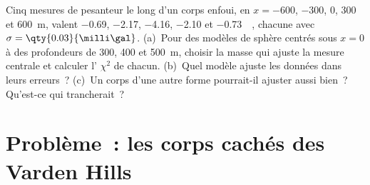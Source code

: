 \begin{exercise}[$\star\star\star$]\label{exo:b3:field-lab-methods-3:12}
Cinq mesures de pesanteur le long d'un corps enfoui, en $x = -600$, $-300$, $0$,
$300$ et \qty{600}{m}, valent \num{-0.69}, \num{-2.17}, \num{-4.16},
\num{-2.10} et \qty{-0.73}{\milli\gal}, chacune avec $\sigma =
\qty{0.03}{\milli\gal}$. (a)~Pour des modèles de sphère centrés sous $x = 0$ à des
profondeurs de \num{300}, \num{400} et \qty{500}{m}, choisir la masse qui
ajuste la mesure centrale et calculer l' $\chi^2$ de chacun. (b)~Quel
modèle ajuste les données dans leurs erreurs~? (c)~Un corps d'une autre
forme pourrait-il ajuster aussi bien~? Qu'est-ce qui trancherait~?
\end{exercise}

\section{Problème~: les corps cachés des Varden Hills}

